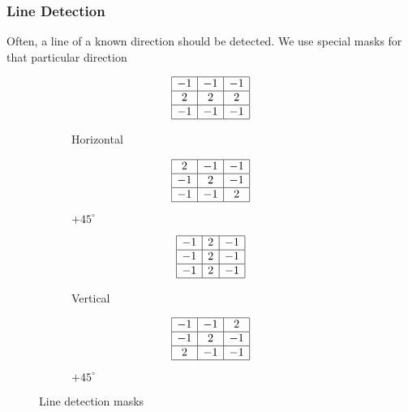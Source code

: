 \subsubsection{Line Detection}
Often, a line of a known direction should be detected. We use special masks for that particular direction
\begin{figure}[h]
	\centering
	\begin{subfigure}[b]{0.2\textwidth}
		\centering
		\[
		\begin{array}{|c|c|c|}
			\hline
			-1 & -1 & -1\\
			\hline
			2 & 2 & 2\\
			\hline
			-1 & -1 & -1\\
			\hline
		\end{array}
		\]
		\caption{Horizontal}
	\end{subfigure}
	\begin{subfigure}[b]{0.2\textwidth}
		\centering
		\[
		\begin{array}{|c|c|c|}
			\hline
			2 & -1 & -1\\
			\hline
			-1 & 2 & -1\\
			\hline
			-1 & -1 & 2\\
			\hline
		\end{array}
		\]
		\caption{$+45^\circ$}
	\end{subfigure}
	\begin{subfigure}[b]{0.2\textwidth}
		\centering
		\[
		\begin{array}{|c|c|c|}
			\hline
			-1 & 2 & -1\\
			\hline
			-1 & 2 & -1\\
			\hline
			-1 & 2 & -1\\
			\hline
		\end{array}
		\]
		\caption{Vertical}
	\end{subfigure}
	\begin{subfigure}[b]{0.2\textwidth}
		\centering
		\[
		\begin{array}{|c|c|c|}
			\hline
			-1 & -1 & 2\\
			\hline
			-1 & 2 & -1\\
			\hline
			2 & -1 & -1\\
			\hline
		\end{array}
		\]
		\caption{$+45^\circ$}
	\end{subfigure}
	\caption{Line detection masks}
\end{figure}

